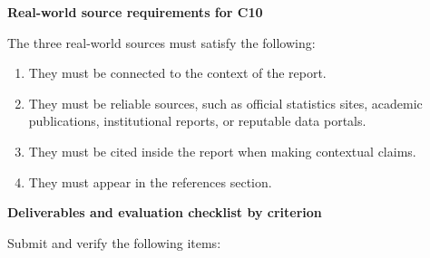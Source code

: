 \documentclass[12pt]{article}
\newcommand{\SubsectionBox}[1]{%
	\noindent\colorbox{gray!30}{%
		\parbox{\linewidth}{\textbf{#1}}%
	}\par\vspace{0.35cm}%
}
\begin{document}
	\SubsectionBox{Real-world source requirements for C10}
	The three real-world sources must satisfy the following:
	\begin{enumerate}
		\item They must be connected to the context of the report.
		\item They must be reliable sources, such as official statistics sites, academic publications, institutional reports, or reputable data portals.
		\item They must be cited inside the report when making contextual claims.
		\item They must appear in the references section.
	\end{enumerate}
	
	\SubsectionBox{Deliverables and evaluation checklist by criterion}
	Submit and verify the following items:
\end{document}
